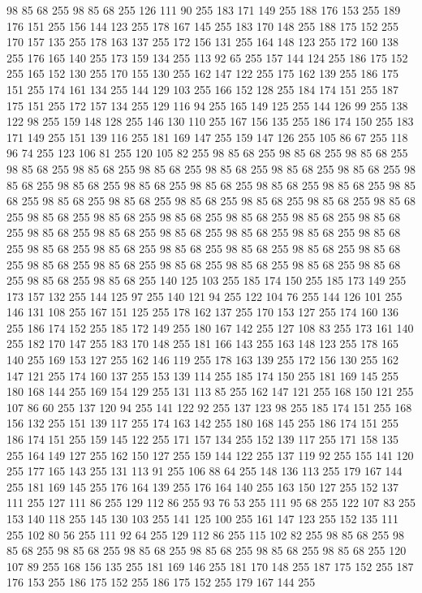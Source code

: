 98 85 68 255 98 85 68 255 126 111 90 255 183 171 149 255 188 176 153 255 189 176 151 255 156 144 123 255 178 167 145 255 183 170 148 255 188 175 152 255 170 157 135 255 178 163 137 255 172 156 131 255 164 148 123 255 172 160 138 255 176 165 140 255 173 159 134 255 113 92 65 255 157 144 124 255 186 175 152 255 165 152 130 255 170 155 130 255 162 147 122 255 175 162 139 255 186 175 151 255 174 161 134 255 144 129 103 255 166 152 128 255 184 174 151 255 187 175 151 255 172 157 134 255 129 116 94 255 165 149 125 255 144 126 99 255 138 122 98 255 159 148 128 255 146 130 110 255 167 156 135 255 186 174 150 255 183 171 149 255 151 139 116 255 181 169 147 255 159 147 126 255 105 86 67 255 118 96 74 255 123 106 81 255 120 105 82 255 98 85 68 255 98 85 68 255 98 85 68 255 98 85 68 255 98 85 68 255 98 85 68 255 98 85 68 255 98 85 68 255 98 85 68 255 98 85 68 255 98 85 68 255 98 85 68 255 98 85 68 255 98 85 68 255 98 85 68 255 98 85 68 255 98 85 68 255
98 85 68 255 98 85 68 255 98 85 68 255 98 85 68 255 98 85 68 255 98 85 68 255 98 85 68 255 98 85 68 255 98 85 68 255 98 85 68 255 98 85 68 255 98 85 68 255 98 85 68 255 98 85 68 255 98 85 68 255 98 85 68 255 98 85 68 255 98 85 68 255 98 85 68 255 98 85 68 255 98 85 68 255 98 85 68 255 98 85 68 255 98 85 68 255 98 85 68 255 98 85 68 255 98 85 68 255 98 85 68 255 98 85 68 255 98 85 68 255 98 85 68 255 140 125 103 255 185 174 150 255 185 173 149 255 173 157 132 255 144 125 97 255 140 121 94 255 122 104 76 255 144 126 101 255 146 131 108 255 167 151 125 255 178 162 137 255 170 153 127 255 174 160 136 255 186 174 152 255 185 172 149 255 180 167 142 255 127 108 83 255 173 161 140 255 182 170 147 255 183 170 148 255 181 166 143 255 163 148 123 255 178 165 140 255 169 153 127 255 162 146 119 255 178 163 139 255 172 156 130 255 162 147 121 255 174 160 137 255 153 139 114 255 185 174 150 255 181 169 145 255 180 168 144 255
169 154 129 255 131 113 85 255 162 147 121 255 168 150 121 255 107 86 60 255 137 120 94 255 141 122 92 255 137 123 98 255 185 174 151 255 168 156 132 255 151 139 117 255 174 163 142 255 180 168 145 255 186 174 151 255 186 174 151 255 159 145 122 255 171 157 134 255 152 139 117 255 171 158 135 255 164 149 127 255 162 150 127 255 159 144 122 255 137 119 92 255 155 141 120 255 177 165 143 255 131 113 91 255 106 88 64 255 148 136 113 255 179 167 144 255 181 169 145 255 176 164 139 255 176 164 140 255 163 150 127 255 152 137 111 255 127 111 86 255 129 112 86 255 93 76 53 255 111 95 68 255 122 107 83 255 153 140 118 255 145 130 103 255 141 125 100 255 161 147 123 255 152 135 111 255 102 80 56 255 111 92 64 255 129 112 86 255 115 102 82 255 98 85 68 255 98 85 68 255 98 85 68 255 98 85 68 255 98 85 68 255 98 85 68 255 98 85 68 255 120 107 89 255 168 156 135 255 181 169 146 255 181 170 148 255 187 175 152 255 187 176 153 255 186 175 152 255 186 175 152 255 179 167 144 255
